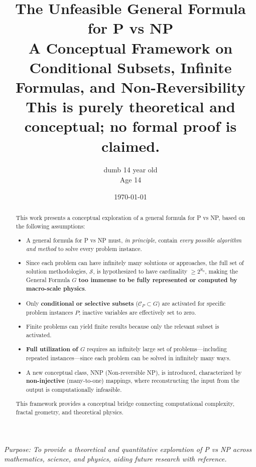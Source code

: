\documentclass[12pt]{article}
\title{\textbf{The Unfeasible General Formula for P vs NP}\\
\large A Conceptual Framework on Conditional Subsets, Infinite Formulas, and Non-Reversibility \\
\textbf{This is purely theoretical and conceptual; no formal proof is claimed.}}
\author{dumb 14 year old \\ Age 14}
\date{\today}
\begin{document}
\maketitle
\thispagestyle{empty}

\vspace{2cm}

\begin{abstract}
This work presents a conceptual exploration of a general formula for P vs NP, based on the following assumptions:

\begin{itemize}
    \item A general formula for P vs NP must, \textit{in principle}, contain \textit{every possible algorithm and method} to solve every problem instance.
    \item Since each problem can have infinitely many solutions or approaches, the full set of solution methodologies, $\mathcal{S}$, is hypothesized to have cardinality $\ge 2^{\aleph_0}$, making the General Formula $G$ \textbf{too immense to be fully represented or computed by macro-scale physics}.
    \item Only \textbf{conditional or selective subsets} ($\mathcal{C}_P \subset G$) are activated for specific problem instances $P$; inactive variables are effectively set to zero.
    \item Finite problems can yield finite results because only the relevant subset is activated.
    \item \textbf{Full utilization of $G$} requires an infinitely large set of problems—including repeated instances—since each problem can be solved in infinitely many ways.
    \item A new conceptual class, NNP (Non-reversible NP), is introduced, characterized by \textbf{non-injective} (many-to-one) mappings, where reconstructing the input from the output is computationally infeasible.
\end{itemize}

This framework provides a conceptual bridge connecting computational complexity, fractal geometry, and theoretical physics.
\end{abstract}

\vfill

\begin{center}
\textit{Purpose: To provide a theoretical and quantitative exploration of P vs NP across mathematics, science, and physics, aiding future research with reference.}
\end{center}
\end{document}

